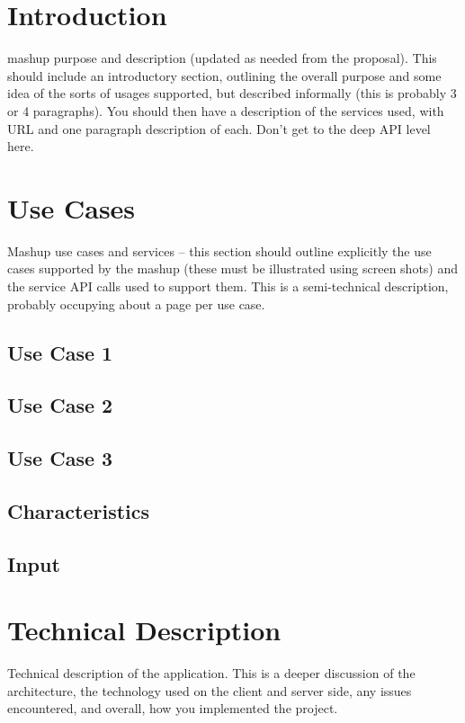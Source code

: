 \documentclass[12pt]{article}
\begin{document}
\section{Introduction}
 mashup purpose and description (updated as needed from the proposal). This should include an introductory section, outlining the overall purpose and some idea of the sorts of usages supported, but described informally (this is probably 3 or 4 paragraphs). You should then have a description of the services used, with URL and one paragraph description of each. Don’t get to the deep API level here.
 
 

\section{ Use Cases }
Mashup use cases and services – this section should outline explicitly the use cases supported by the mashup (these must be illustrated using screen shots) and the service API calls used to support them. This is a semi-technical description, probably
occupying about a page per use case.

\subsection{Use Case 1}
\subsection{Use Case 2}
\subsection{Use Case 3}


\subsection{Characteristics}




\subsection{Input}

\section{Technical Description}

Technical description of the application. This is a deeper discussion of the architecture,
the technology used on the client and server side, any issues encountered, and overall,
how you implemented the project.
\end{document}
